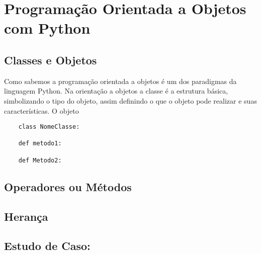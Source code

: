 

\chapter{ Programação Orientada a Objetos com Python}



    \section{Classes e Objetos}
	Como sabemos a programação orientada a objetos é um dos paradigmas da linguagem Python. Na orientação a objetos a classe é a estrutura básica, simbolizando o tipo do objeto, assim definindo o que o objeto pode realizar e suas características. O objeto  

   \begin{lstlisting}
    class NomeClasse:

    def metodo1:

    def Metodo2:

    \end{lstlisting}

    \section{Operadores ou Métodos}


    \section{Herança}


    \section{Estudo de Caso: }
